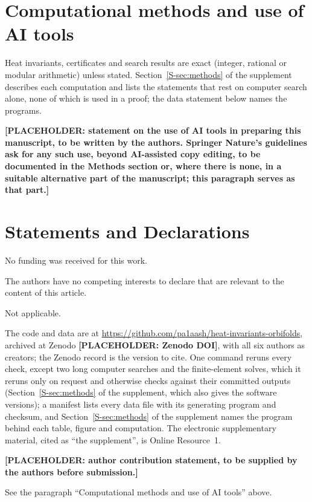 \documentclass[pdflatex,sn-mathphys-num]{sn-jnl}
\theoremstyle{thmstyleone}%
\theoremstyle{thmstylethree}%
\newcommand{\sref}[1]{\ref*{S-#1}}%
\begin{document}
\section*{Computational methods and use of AI tools}
Heat invariants, certificates and search results are exact (integer, rational or modular arithmetic) unless stated. Section~\sref{sec:methods} of the supplement describes each computation and lists the statements that rest on computer search alone, none of which is used in a proof; the data statement below names the programs.

\textbf{[PLACEHOLDER: statement on the use of AI tools in preparing this manuscript, to be written by the authors. Springer Nature's guidelines ask for any such use, beyond AI-assisted copy editing, to be documented in the Methods section or, where there is none, in a suitable alternative part of the manuscript; this paragraph serves as that part.]}

\section*{Statements and Declarations}

No funding was received for this work.

The authors have no competing interests to declare that are relevant to the content of this article.

Not applicable.

The code and data are at \url{https://github.com/pa1aash/heat-invariants-orbifolds}, archived at Zenodo \textbf{[PLACEHOLDER: Zenodo DOI]}, with all six authors as creators; the Zenodo record is the version to cite. One command reruns every check, except two long computer searches and the finite-element solves, which it reruns only on request and otherwise checks against their committed outputs (Section~\sref{sec:methods} of the supplement, which also gives the software versions); a manifest lists every data file with its generating program and checksum, and Section~\sref{sec:methods} of the supplement names the program behind each table, figure and computation. The electronic supplementary material, cited as ``the supplement'', is Online Resource~1.

\textbf{[PLACEHOLDER: author contribution statement, to be supplied by the authors before submission.]}

See the paragraph ``Computational methods and use of AI tools'' above.
\end{document}
